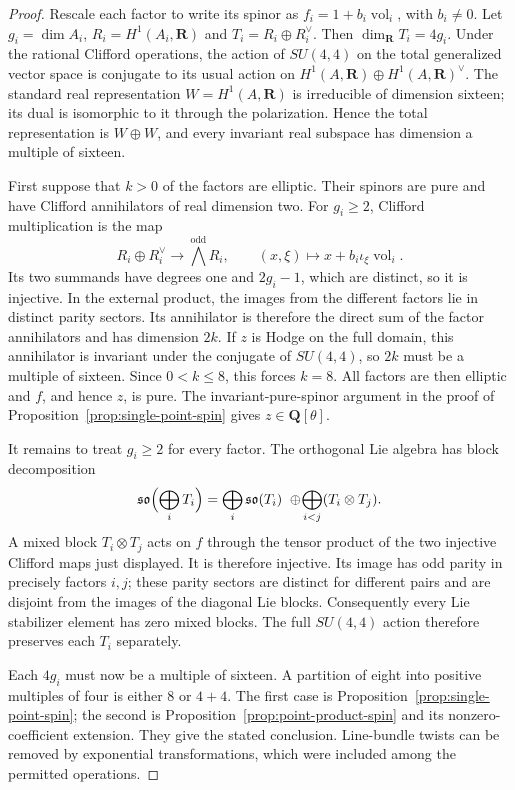 \documentclass[11pt]{article}
\theoremstyle{definition}
\theoremstyle{remark}
\newcommand{\Q}{\mathbf Q}
\newcommand{\R}{\mathbf R}
\begin{document}
\begin{proof}
Rescale each factor to write its spinor as
$f_i=1+b_i\operatorname{vol}_i$, with $b_i\ne0$.
Let $g_i=\dim A_i$, $R_i=H^1(A_i,\R)$ and
$T_i=R_i\oplus R_i^\vee$. Then $\dim_\R T_i=4g_i$.
Under the rational Clifford operations, the action of $SU(4,4)$ on
the total generalized vector space is conjugate to its usual action
on $H^1(A,\R)\oplus H^1(A,\R)^\vee$. The standard real
representation $W=H^1(A,\R)$ is irreducible of dimension sixteen;
its dual is isomorphic to it through the polarization. Hence the
total representation is $W\oplus W$, and every invariant real
subspace has dimension a multiple of sixteen.

First suppose that $k>0$ of the factors are elliptic. Their spinors
are pure and have Clifford annihilators of real dimension two.
For $g_i\ge2$, Clifford multiplication is the map
\[
 R_i\oplus R_i^\vee\longrightarrow\bigwedge^{\mathrm{odd}}R_i,
 \qquad(x,\xi)\longmapsto x+b_i\iota_\xi\operatorname{vol}_i.
\]
Its two summands have degrees one and $2g_i-1$, which are distinct,
so it is injective. In the external product, the images from the
different factors lie in distinct parity sectors. Its annihilator
is therefore the direct sum of the factor annihilators and has
dimension $2k$. If $z$ is Hodge on the full domain, this annihilator
is invariant under the conjugate of $SU(4,4)$, so $2k$ must be a
multiple of sixteen. Since $0<k\le8$, this forces $k=8$.
All factors are then elliptic and $f$, and hence $z$, is pure.
The invariant-pure-spinor argument in the proof of
Proposition~\ref{prop:single-point-spin} gives $z\in\Q[\theta]$.

It remains to treat $g_i\ge2$ for every factor. The orthogonal Lie
algebra has block decomposition
\[
 \mathfrak{so}\Bigl(\bigoplus_iT_i\Bigr)
 =\bigoplus_i\mathfrak{so}(T_i)
  \ \oplus\!\bigoplus_{i<j}(T_i\otimes T_j).
\]
A mixed block $T_i\otimes T_j$ acts on $f$ through the tensor product
of the two injective Clifford maps just displayed. It is therefore
injective. Its image has odd parity in precisely factors $i,j$;
these parity sectors are distinct for different pairs and are
disjoint from the images of the diagonal Lie blocks. Consequently
every Lie stabilizer element has zero mixed blocks. The full
$SU(4,4)$ action therefore preserves each $T_i$ separately.

Each $4g_i$ must now be a multiple of sixteen. A partition of eight
into positive multiples of four is either $8$ or $4+4$.
The first case is Proposition~\ref{prop:single-point-spin}; the
second is Proposition~\ref{prop:point-product-spin} and its
nonzero-coefficient extension. They give the stated conclusion.
Line-bundle twists can be removed by exponential transformations,
which were included among the permitted operations.
\end{proof}
\end{document}
